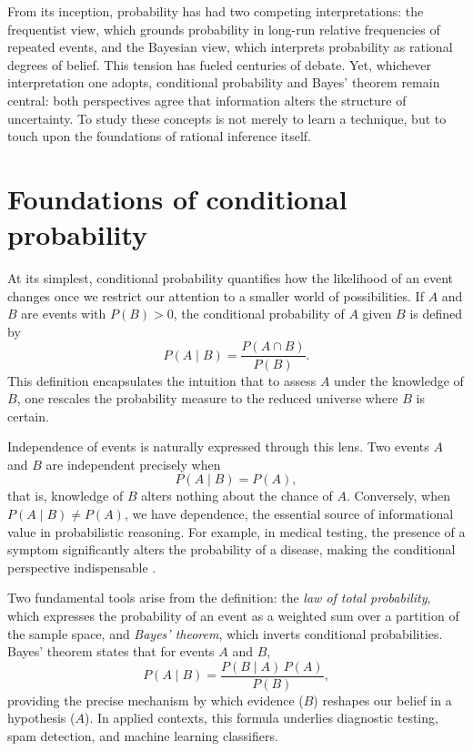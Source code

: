 \documentclass{book}
\begin{document}
From its inception, probability has had two competing interpretations: the frequentist view, which grounds probability in long-run relative frequencies of repeated events, and the Bayesian view, which interprets probability as rational degrees of belief. This tension has fueled centuries of debate. Yet, whichever interpretation one adopts, conditional probability and Bayes’ theorem remain central: both perspectives agree that information alters the structure of uncertainty. To study these concepts is not merely to learn a technique, but to touch upon the foundations of rational inference itself.

\section{Foundations of conditional probability}

At its simplest, conditional probability quantifies how the likelihood of an event changes once we restrict our attention to a smaller world of possibilities. If $A$ and $B$ are events with $P(B) > 0$, the conditional probability of $A$ given $B$ is defined by
\[
P(A \mid B) = \frac{P(A \cap B)}{P(B)} .
\]
This definition encapsulates the intuition that to assess $A$ under the knowledge of $B$, one rescales the probability measure to the reduced universe where $B$ is certain.

\medskip

Independence of events is naturally expressed through this lens. Two events $A$ and $B$ are independent precisely when
\[
P(A \mid B) = P(A) ,
\]
that is, knowledge of $B$ alters nothing about the chance of $A$. Conversely, when $P(A \mid B) \neq P(A)$, we have dependence, the essential source of informational value in probabilistic reasoning. For example, in medical testing, the presence of a symptom significantly alters the probability of a disease, making the conditional perspective indispensable \cite{feller1950probability}.

\medskip

Two fundamental tools arise from the definition: the \emph{law of total probability}, which expresses the probability of an event as a weighted sum over a partition of the sample space, and \emph{Bayes’ theorem}, which inverts conditional probabilities. Bayes’ theorem states that for events $A$ and $B$,
\[
P(A \mid B) = \frac{P(B \mid A) \, P(A)}{P(B)} ,
\]
providing the precise mechanism by which evidence ($B$) reshapes our belief in a hypothesis ($A$). In applied contexts, this formula underlies diagnostic testing, spam detection, and machine learning classifiers.
\end{document}
